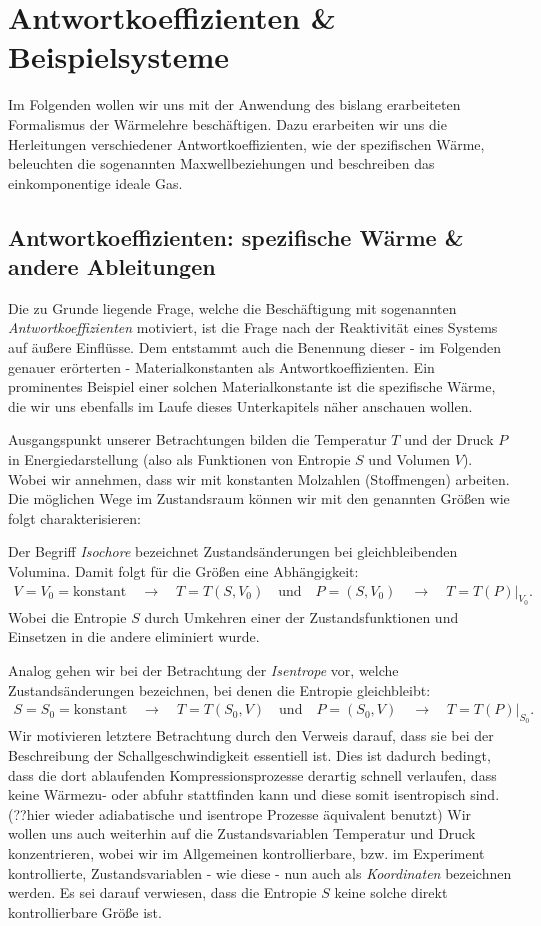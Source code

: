 \section{Antwortkoeffizienten \& Beispielsysteme}
Im Folgenden wollen wir uns mit der Anwendung des bislang erarbeiteten Formalismus der Wärmelehre beschäftigen. Dazu erarbeiten wir uns die Herleitungen verschiedener Antwortkoeffizienten, wie der spezifischen Wärme, beleuchten die sogenannten Maxwellbeziehungen und beschreiben das einkomponentige ideale Gas.  
\subsection{Antwortkoeffizienten: spezifische Wärme \& andere Ableitungen}
Die zu Grunde liegende Frage, welche die Beschäftigung mit sogenannten \emph{Antwortkoeffizienten} motiviert, ist die Frage nach der Reaktivität eines Systems auf äußere Einflüsse. Dem entstammt auch die Benennung dieser - im Folgenden genauer erörterten - Materialkonstanten als Antwortkoeffizienten. 
Ein prominentes Beispiel einer solchen Materialkonstante ist die spezifische Wärme, die wir uns ebenfalls im Laufe dieses Unterkapitels näher anschauen wollen.


Ausgangspunkt unserer Betrachtungen bilden die Temperatur $T$ und der Druck $P$ in Energiedarstellung (also als Funktionen von Entropie $S$ und Volumen $V$). Wobei wir annehmen, dass wir mit konstanten Molzahlen (Stoffmengen) arbeiten.  Die möglichen Wege im Zustandsraum können wir mit den genannten Größen wie folgt charakterisieren: 


Der Begriff \emph{Isochore} bezeichnet Zustandsänderungen bei gleichbleibenden Volumina. Damit folgt für die Größen eine Abhängigkeit: 
\begin{align*}
    V=V_0=\text{konstant}\quad\rightarrow\quad T=T(S,V_0) \quad\text{und}\quad P=(S,V_0) \quad\rightarrow\quad T=T(P)|_{V_0}.
\end{align*}
Wobei die Entropie $S$ durch Umkehren einer der Zustandsfunktionen und Einsetzen in die andere eliminiert wurde.


Analog gehen wir bei der Betrachtung der \emph{Isentrope} vor, welche Zustandsänderungen bezeichnen, bei denen die Entropie gleichbleibt: 
\begin{align*}
    S=S_0=\text{konstant}\quad\rightarrow\quad T=T(S_0,V) \quad\text{und}\quad P=(S_0,V) \quad\rightarrow\quad T=T(P)|_{S_0}.
\end{align*}
Wir motivieren letztere Betrachtung durch den Verweis darauf, dass sie bei der Beschreibung der Schallgeschwindigkeit essentiell ist. Dies ist dadurch bedingt, dass die dort ablaufenden Kompressionsprozesse derartig schnell verlaufen, dass keine Wärmezu- oder abfuhr stattfinden kann und diese somit isentropisch sind. (??hier wieder adiabatische und isentrope Prozesse äquivalent benutzt)
Wir wollen uns auch weiterhin auf die Zustandsvariablen Temperatur und Druck konzentrieren, wobei wir im Allgemeinen kontrollierbare, bzw. im Experiment kontrollierte, Zustandsvariablen - wie diese - nun auch als \emph{Koordinaten} bezeichnen werden. Es sei darauf verwiesen, dass die Entropie $S$ keine solche direkt kontrollierbare Größe ist.

